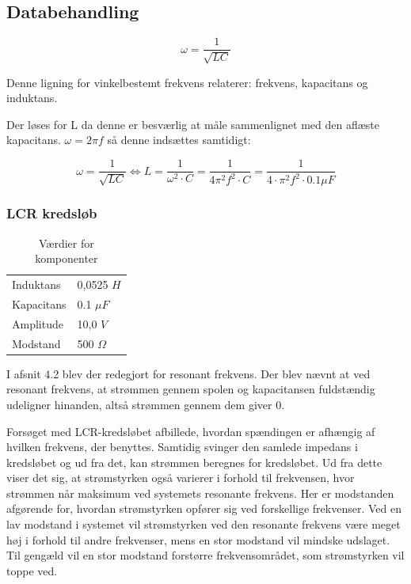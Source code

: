 \subsection{Databehandling}


\begin{equation} \label{angfreq}
\omega = \frac{1}{\sqrt{LC}}
\end{equation}

Denne ligning for vinkelbestemt frekvens relaterer: frekvens, kapacitans og induktans.

Der løses for L da denne er besværlig at måle sammenlignet med den aflæste kapacitans. $\omega = 2\pi f$ så denne indsættes samtidigt:

\begin{equation}
\omega = \frac{1}{\sqrt{LC}} \Leftrightarrow L = \frac{1}{\omega^2 \cdot C} = \frac{1}{4\pi^2 f^2 \cdot C} = \frac{1}{4\cdot \pi^2 f^2\cdot 0.1\mu F}
\end{equation}


\subsubsection{LCR kredsløb}

\begin{table}[H]
\centering
\begin{tabular}{l|l}
Induktans  & 0,0525 $H$ \\ 
Kapacitans & 0.1 $\mu F$   \\
Amplitude  & 10,0 $V$   \\
Modstand   & 500 $\Omega$ \\
\end{tabular}
\caption{Værdier for komponenter}
\label{tabular:value}
\end{table}

I afsnit 4.2 blev der redegjort for resonant frekvens. Der blev nævnt at ved resonant frekvens, at strømmen gennem spolen og kapacitansen fuldstændig udeligner hinanden, altså strømmen gennem dem giver $0$.

Forsøget med LCR-kredsløbet afbillede, hvordan spændingen er afhængig af hvilken frekvens, der benyttes. Samtidig svinger den samlede impedans i kredsløbet og ud fra det, kan strømmen beregnes for kredsløbet. Ud fra dette viser det sig, at strømstyrken også varierer i forhold til frekvensen, hvor strømmen når maksimum ved systemets resonante frekvens. Her er modstanden afgørende for, hvordan strømstyrken opfører sig ved forskellige frekvenser. Ved en lav modstand i systemet vil strømstyrken ved den resonante frekvens være meget høj i forhold til andre frekvenser, mens en stor modstand vil mindske udslaget. Til gengæld vil en stor modstand forstørre frekvensområdet, som strømstyrken vil toppe ved.

